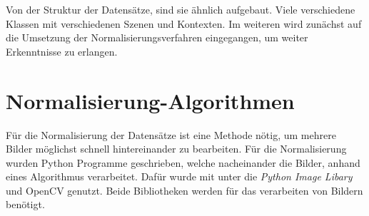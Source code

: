 Von der Struktur der Datensätze, sind sie ähnlich aufgebaut. Viele verschiedene Klassen mit verschiedenen Szenen und Kontexten. Im weiteren wird zunächst auf die Umsetzung der Normalisierungsverfahren eingegangen, um weiter Erkenntnisse zu erlangen.
\section{Normalisierung-Algorithmen}\label{s.nalgorithmen}
Für die Normalisierung der Datensätze ist eine Methode nötig, um mehrere Bilder möglichst schnell hintereinander zu bearbeiten. Für die Normalisierung wurden Python Programme geschrieben, welche nacheinander die Bilder, anhand eines Algorithmus verarbeitet. Dafür wurde mit unter die \textit{Python Image Libary} und OpenCV genutzt. Beide Bibliotheken werden für das verarbeiten von Bildern benötigt. 
